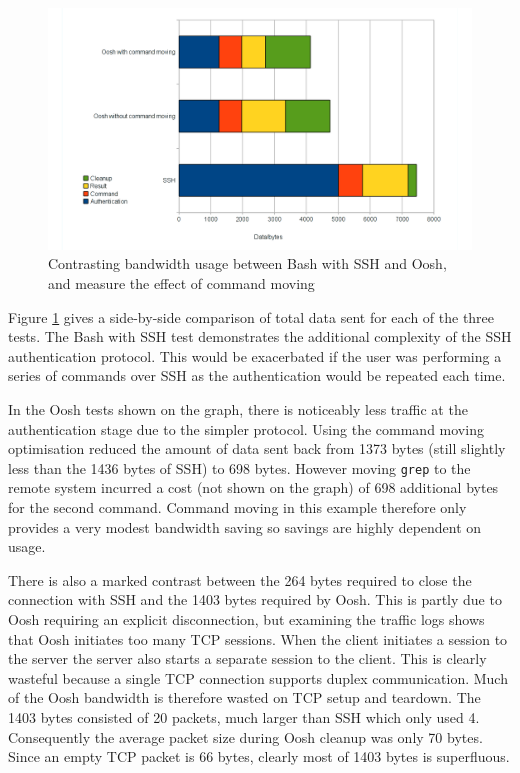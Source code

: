 \documentclass[12pt,twoside,notitlepage]{report}
\begin{document}
\begin{figure}[h]
\centering
\includegraphics[scale=0.5]{network_graph.png}
\caption{Contrasting bandwidth usage between Bash with SSH and Oosh,
  and measure the effect of command moving}
\label{networkgraph}
\end{figure}

Figure \ref{networkgraph} gives a side-by-side comparison of total
data sent for each of the three tests. The Bash with SSH test
demonstrates the additional complexity of the SSH authentication
protocol. This would be exacerbated if the user was performing a
series of commands over SSH as the authentication would be repeated
each time.

In the Oosh tests shown on the graph, there is noticeably less traffic
at the authentication stage due to the simpler protocol. Using the
command moving optimisation reduced the amount of data sent back from
1373 bytes (still slightly less than the 1436 bytes of SSH) to 698
bytes. However moving {\tt grep} to the remote system incurred a cost
(not shown on the graph) of 698 additional bytes for the second
command. Command moving in this example therefore only provides a very
modest bandwidth saving so savings are highly dependent on usage.

There is also a marked contrast between the 264 bytes required to
close the connection with SSH and the 1403 bytes required by
Oosh. This is partly due to Oosh requiring an explicit disconnection,
but examining the traffic logs shows that Oosh initiates too many TCP
sessions. When the client initiates a session to the server the server
also starts a separate session to the client. This is clearly wasteful
because a single TCP connection supports duplex communication. Much of
the Oosh bandwidth is therefore wasted on TCP setup and teardown. The
1403 bytes consisted of 20 packets, much larger than SSH which only
used 4. Consequently the average packet size during Oosh cleanup was
only 70 bytes. Since an empty TCP packet is 66 bytes, clearly most of 1403
bytes is superfluous.
\end{document}
